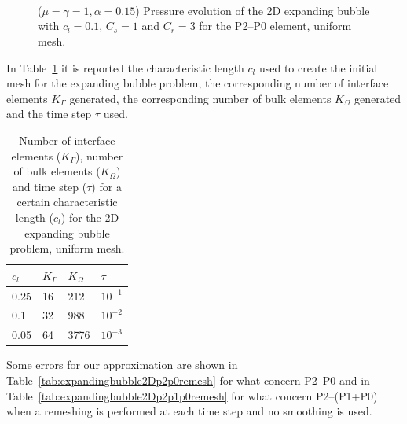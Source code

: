 \documentclass[a4paper,12pt,onecolumn]{article}
\begin{document}
\begin{figure}[htbp]
  \centering
  \\
  \quad
  \\
  \quad
  \\
  \caption{($\mu=\gamma=1,\alpha = 0.15$) Pressure evolution of the 2D expanding bubble with $c_l=0.1$, $C_s=1$ and $C_r=3$ for the P2--P0 element, uniform mesh.}
  \label{fig:expanding_bubble_uniform}
\end{figure}

In Table~\ref{tab:expandingbubble2Delements} it is reported the characteristic length $c_l$ used to create the initial mesh for the expanding bubble problem, the corresponding number of interface elements $K_\Gamma$ generated, the corresponding number of bulk elements $K_\Omega$ generated and the time step $\tau$ used. 
\begin{table}
 \center
\begin{tabular}{llll}
\hline
$c_l$ & $K_\Gamma$ & $K_\Omega$ & $\tau$\\
\hline
0.25 & 16 & 212 & $10^{-1}$ \\
0.1 & 32 & 988 & $10^{-2}$ \\
0.05 & 64 & 3776 & $10^{-3}$ \\
\hline
\end{tabular}
\caption{Number of interface elements ($K_\Gamma$), number of bulk elements ($K_\Omega$) and time step ($\tau$) for a certain characteristic length ($c_l$) for the 2D expanding bubble problem, uniform mesh.}
\label{tab:expandingbubble2Delements}
\end{table}

Some errors for our approximation are shown in Table~\ref{tab:expandingbubble2Dp2p0remesh} for what concern P2--P0 and in Table~\ref{tab:expandingbubble2Dp2p1p0remesh} for what concern P2--(P1+P0)  when a remeshing is performed at each time step and no smoothing is used.
\end{document}
